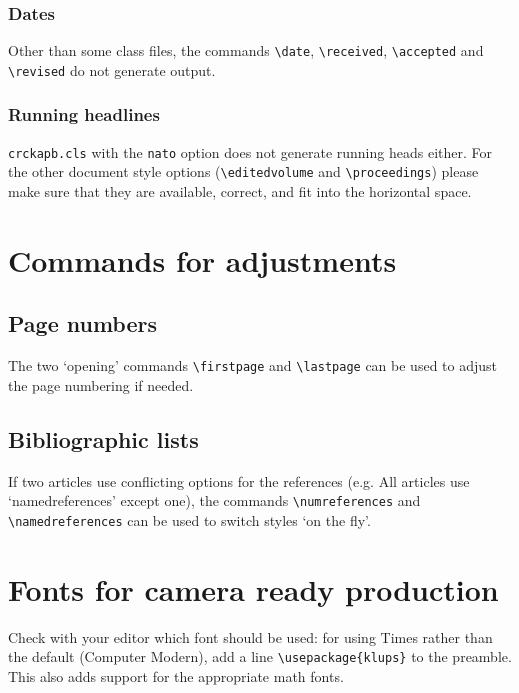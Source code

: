 \documentclass[a4paper,namedreferences]{kluwer}
\begin{document}
\begin{article}
\subsubsection*{Dates}

Other than some class files, the commands \verb+\date+, \verb+\received+,
\verb+\accepted+ and \verb+\revised+ do not generate output.

\subsubsection*{Running headlines}

\verb+crckapb.cls+ with the \verb+nato+ option does not generate running
heads either. For the other document style options (\verb+\editedvolume+ 
and \verb+\proceedings+) please make sure that they are available, 
correct, and fit into the horizontal space.


\section*{Commands for adjustments}

\subsection*{Page numbers}

The two `opening' commands \verb"\firstpage" and \verb"\lastpage" 
can be used to adjust the page numbering if needed.

                                                          



                                                                        
\subsection*{Bibliographic lists}

If two articles use conflicting options for the references
(e.g. All articles use `namedreferences' except one), the commands
\verb"\numreferences" and\break 
\verb"\namedreferences" can be used to 
switch styles `on the fly'.

\section*{Fonts for camera ready production}
                          
Check with your editor which font should be used:
for using Times rather than the default (Computer Modern), add a line
\verb"\usepackage{klups}" to the preamble. This also adds support
for the appropriate math fonts.


\end{article}
\end{document}
